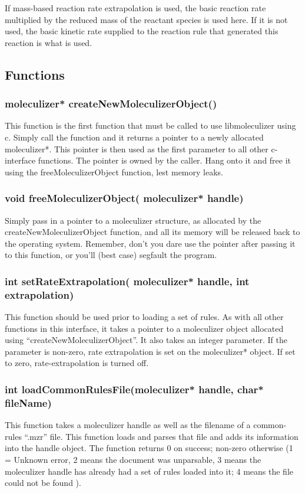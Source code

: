 If mass-based reaction rate extrapolation is used, the basic reaction
rate multiplied by the reduced mass of the reactant species is used
here.  If it is not used, the basic kinetic rate supplied to the
reaction rule that generated this reaction is what is used.  

\subsection{Functions}
\subsubsection{moleculizer* createNewMoleculizerObject()}
This function is the first function that must be called to use
libmoleculizer using c.  Simply call the function and it returns a
pointer to a newly allocated moleculizer*.  This pointer is then used
as the first parameter to all other c-interface functions.  The
pointer is owned by the caller.  Hang onto it and free it using the
freeMoleculizerObject function, lest memory leaks.

\subsubsection{void freeMoleculizerObject( moleculizer* handle)}
Simply pass in a pointer to a moleculizer structure, as allocated by
the createNewMoleculizerObject function, and all its memory will be
released back to the operating system.  Remember, don't you dare use
the pointer after passing it to this function, or you'll (best case)
segfault the program.

\subsubsection{int setRateExtrapolation( moleculizer* handle, int
  extrapolation)}
This function should be used prior to loading a set of rules.  As with
all other functions in this interface, it takes a pointer to a
moleculizer object allocated using ``createNewMoleculizerObject''.  It
also takes an integer parameter.  If the parameter is non-zero, rate
extrapolation is set on the moleculizer* object.  If set to zero,
rate-extrapolation is turned off.  

\subsubsection{int loadCommonRulesFile(moleculizer* handle, char*
  fileName)}
This function takes a moleculizer handle as well as the filename of a
common-rules ``.mzr'' file.  This function loads and parses that file
and adds its information into the handle object.  The function returns
0 on success; non-zero otherwise (1 = Unknown error, 2 means the
document was unparsable, 3 means the moleculizer handle has already
had a set of rules loaded into it; 4 means the file could not be found
). 
